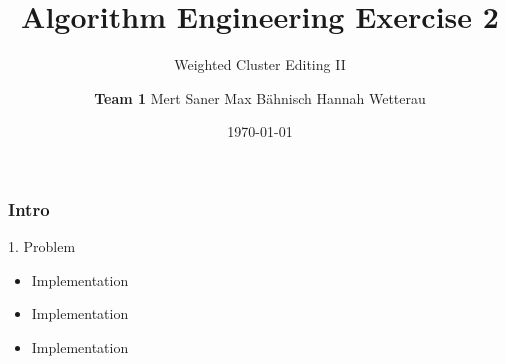 \documentclass{beamer}
\title[Exercise 2: Weighted Cluster Editing II]{Algorithm Engineering Exercise 2 } %
\subtitle {Weighted Cluster Editing II}
\author[Saner,  Bähnisch,  Wetterau]{\textbf{Team 1 } \newline Mert Saner \newline Max Bähnisch \newline Hannah Wetterau  \newline}
\date{ \today }
\institute[] %
{
\textit{TU Berlin} \\\textit{Institute of Software Engineering and Theoretical Computer Science} \\ %
\medskip
}
\begin{document}
\titlepage %

\tableofcontents %



\begin{frame}
\frametitle{Intro}

1. Problem

\begin{itemize}
\item  Implementation
\item  Implementation
\item  Implementation
\end{itemize}
\end{frame}
\end{document}

